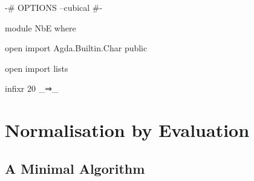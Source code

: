\begin{code}[hide]
{-# OPTIONS --cubical #-}

module NbE where

open import Agda.Builtin.Char public

open import lists

infixr 20 _⇒_
\end{code}

\section{Normalisation by Evaluation}

\subsection{A Minimal Algorithm}

